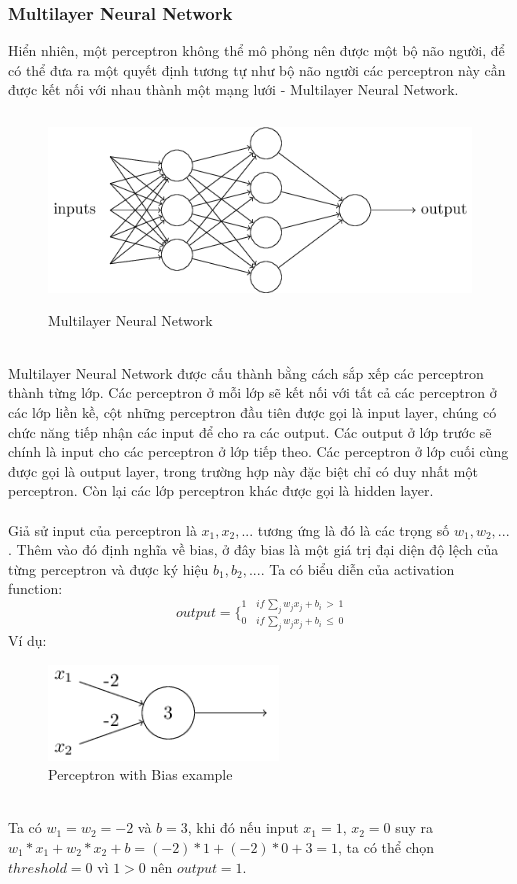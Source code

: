 \subsubsection{Multilayer Neural Network}
Hiển nhiên, một perceptron không thể mô phỏng nên được một bộ não người, để 
có thể đưa ra một quyết định tương tự như bộ não người các perceptron này cần 
được kết nối với nhau thành một mạng lưới - Multilayer Neural Network.\\
\begin{figure}[h!]
\centering
\includegraphics[height=2in, keepaspectratio=true]{multilayerneuralnetwork.png}
\caption{Multilayer Neural Network}
\end{figure}\\
Multilayer Neural Network được cấu thành bằng cách sắp xếp các perceptron thành 
từng lớp. Các perceptron ở mỗi lớp sẽ kết nối với tất cả các perceptron ở các 
lớp liền kề, cột những perceptron đầu tiên được gọi là input layer, chúng có 
chức năng tiếp nhận các input để cho ra các output. Các output ở lớp trước sẽ chính là 
input cho các perceptron ở lớp tiếp theo. Các perceptron ở lớp cuối cùng được gọi là 
output layer, trong trường hợp này đặc biệt chỉ có duy nhất một perceptron. Còn 
lại các lớp perceptron khác được gọi là hidden layer.\\\\
Giả sử input của perceptron là $x_1, x_2, ...$ tương ứng là đó là các trọng 
số $w_1, w_2, ...$. Thêm vào đó định nghĩa về bias, ở đây bias là một giá trị 
đại diện độ lệch của từng perceptron và được ký hiệu $b_1, b_2, ...$. Ta có biểu diễn của activation 
function:\\
\[
  output = 
  \bigg\{
    _{0 \quad if \, \sum_j w_j x_j + b_i\, \leq \, 0}
    ^{1 \quad if \, \sum_j w_j x_j + b_i\, > \, 1}
\]
Ví dụ:\\
\begin{figure}[h!]
\centering
\includegraphics[height=1in, keepaspectratio=true]{exmln.png}
\caption{Perceptron with Bias example}
\end{figure}\\
Ta có $w_1=w_2=-2$ và $b=3$, khi đó nếu input $x_1=1,\, x_2=0$ suy ra $ 
w_1*x_1+w_2*x_2+b=(-2)*1+(-2)*0+3=1$, ta có thể chọn $threshold=0$ vì $1>0$
nên $output=1$.

